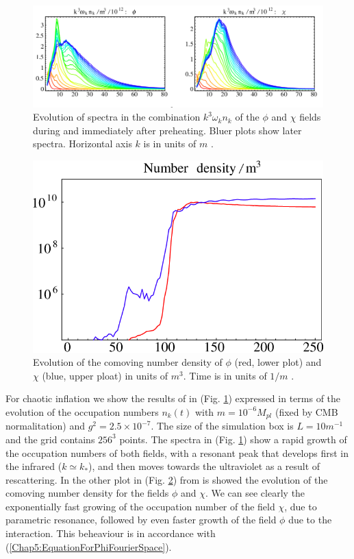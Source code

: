 \documentclass[11pt,a4paper,twoside]{book}
\begin{document}
 \begin{figure}
 	\centering
 	\includegraphics[width=0.8\linewidth, height=0.3\textheight]{Images/Chap5/Fragmentation_Fig1}
 	\caption{Evolution of spectra in the combination $ k^{3}\omega_{k}n_{k} $ of the $\phi$ and $\chi$ fields during and immediately after preheating. Bluer plots show later spectra. Horizontal axis $ k $ is in units of $ m $ \cite{Chap5:Fragmentation}.}
 	\label{fig:fragmentationfig1}
 \end{figure}
 \begin{figure}
 	\centering
 	\includegraphics[width=0.7\linewidth, height=0.3\textheight]{Images/Chap5/Fragmentation_Fig2}
 	\caption{Evolution of the comoving number density of $\phi$ (red, lower plot) and $\chi$ (blue, upper ploat) in units of $ m^{3} $. Time is in units of $ 1/m $ \cite{Chap5:Fragmentation}.}
 	\label{fig:fragmentationfig2}
 \end{figure}
For chaotic inflation we show the results of \cite{Chap5:Fragmentation} in (Fig. \ref{fig:fragmentationfig1}) expressed in terms of the evolution of the occupation numbers $ n_{k}(t) $ with $ m=10^{-6} M_{pl} $ (fixed by CMB normalitation) and $ g^{2}=2.5 \times 10^{-7} $. The size of the simulation box is $ L=10m^{-1} $ and the grid contains $ 256^{3} $ points. The spectra in (Fig. \ref{fig:fragmentationfig1})  show a rapid growth of the occupation numbers of both fields, with a resonant peak that develops first in the infrared ($ k\simeq k_{*} $), and then moves towards the ultraviolet as a result of rescattering. In the other plot in (Fig. \ref{fig:fragmentationfig2}) from \cite{Chap5:Fragmentation} is showed the evolution of the comoving number density for the fields $\phi$ and $\chi$. We can see clearly the exponentially fast growing of the occupation number of the field $\chi$, due to parametric resonance, followed by even faster growth of the field $\phi$ due to the interaction. This beheaviour is in accordance with (\ref{Chap5:EquationForPhiFourierSpace}).
\end{document}
